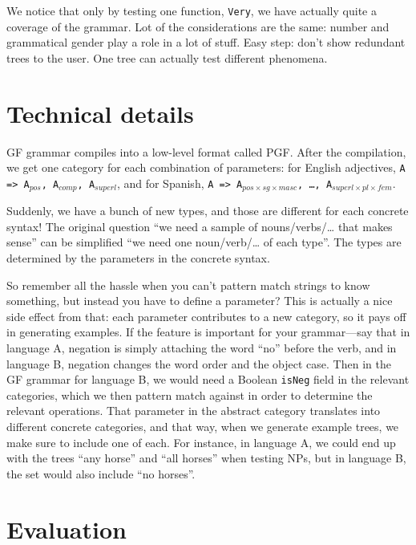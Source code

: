 \documentclass[11pt]{article}
\def\t#1{\texttt{#1}}
\begin{document}
We notice that only by testing one function, \t{Very}, we have
actually quite a coverage of the grammar. Lot of the considerations
are the same: number and grammatical gender play a role in a lot of
stuff. Easy step: don't show redundant trees to the user. One tree can
actually test different phenomena. 

\section{Technical details}

GF grammar compiles into a low-level format called PGF. After the
compilation, we get one category for each combination of parameters:
for English adjectives, \texttt{A => A$_{pos}$, A$_{comp}$,
A$_{superl}$}, and for Spanish, \texttt{A => A$_{pos×sg×masc}$, \dots,
A$_{superl×pl×fem}$}. 

Suddenly, we have a bunch of new types, and those are different for
each concrete syntax! The original question ``we need a sample of
nouns/verbs/… that makes sense'' can be simplified ``we need one
noun/verb/… of each type''. The types are determined by the parameters
in the concrete syntax. 

So remember all the hassle when you can't pattern match strings to
know something, but instead you have to define a parameter? This is
actually a nice side effect from that: each parameter contributes to a
new category, so it pays off in generating examples. If the feature is
important for your grammar---say that in language A, negation is
simply attaching the word  ``no'' before the verb, and in language B,
negation changes the word order and the object case. Then in the GF
grammar for language B, we would need a Boolean \texttt{isNeg} field
in the relevant categories, which we then pattern match against in
order to determine the relevant operations. That parameter in the
abstract category translates into different concrete categories, and
that way, when we generate example trees, we make sure to include one
of each. For instance, in language A, we could end up with the trees
``any horse'' and ``all horses'' when testing NPs, but in language B,
the set would also include ``no horses''. 



\section{Evaluation}
\end{document}
